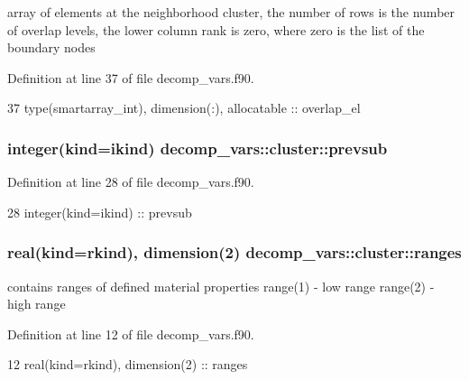 array of elements at the neighborhood cluster, the number of rows is the number of overlap levels, the lower column rank is zero, where zero is the list of the boundary nodes 



Definition at line 37 of file decomp\+\_\+vars.\+f90.


\begin{DoxyCode}
37     \textcolor{keywordtype}{type}(smartarray_int), \textcolor{keywordtype}{dimension(:)}, \textcolor{keywordtype}{allocatable} :: overlap\_el
\end{DoxyCode}
\subsubsection[{prevsub}]{\setlength{\rightskip}{0pt plus 5cm}integer(kind=ikind) decomp\+\_\+vars\+::cluster\+::prevsub\hspace{0.3cm}{\ttfamily [private]}}\label{structdecomp__vars_1_1cluster_a3e2cedb128c215c91251777d6b134066}


Definition at line 28 of file decomp\+\_\+vars.\+f90.


\begin{DoxyCode}
28     \textcolor{keywordtype}{integer(kind=ikind)}   :: prevsub
\end{DoxyCode}
\subsubsection[{ranges}]{\setlength{\rightskip}{0pt plus 5cm}real(kind=rkind), dimension(2) decomp\+\_\+vars\+::cluster\+::ranges\hspace{0.3cm}{\ttfamily [private]}}\label{structdecomp__vars_1_1cluster_a63fe4ef698d426f20051cadeb411389a}


contains ranges of defined material properties range(1) -\/ low range range(2) -\/ high range 



Definition at line 12 of file decomp\+\_\+vars.\+f90.


\begin{DoxyCode}
12     \textcolor{keywordtype}{real(kind=rkind)}, \textcolor{keywordtype}{dimension(2)}    :: ranges
\end{DoxyCode}
